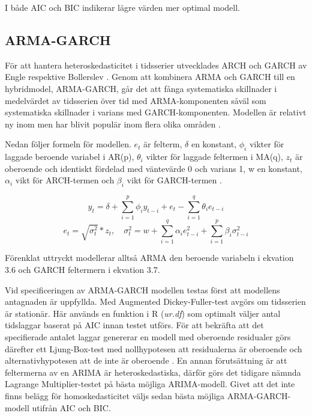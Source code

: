 \documentclass[11pt]{article}
\numberwithin{equation}{section}
\numberwithin{table}{section}
\numberwithin{figure}{section}
\begin{document}
I både AIC och BIC indikerar lägre värden mer optimal modell. 

\subsection{ARMA-GARCH}
För att hantera heteroskedasticitet i tidsserier utvecklades ARCH och GARCH av Engle \parencite*{engle1982autoregressive} respektive Bollerslev \parencite*{bollerslev1986generalized}. Genom att kombinera ARMA och GARCH till en hybridmodel, ARMA-GARCH, går det att fånga systematiska skillnader i medelvärdet av tidsserien över tid med ARMA-komponenten såväl som systematiska skillnader i varians med GARCH-komponenten. Modellen är relativt ny inom men har blivit populär inom flera olika områden \parencite{chen2011short}. 

Nedan följer formeln för modellen. \(e_t\) är felterm, \(\delta\) en konstant, \(\phi_i\) vikter för laggade beroende variabel i AR(p), \(\theta_i\) vikter för laggade feltermen i MA(q), \(z_t\) är oberoende och identiskt fördelad med väntevärde 0 och varians 1, w en konstant, \(\alpha_i\) vikt för ARCH-termen och \(\beta_i\) vikt för GARCH-termen \parencite[][,s.507 ff.]{bollerslev1986generalized, montgomery2015forecasting}.

\begin{equation}
    y_t = \delta + \sum_{i=1}^{p}\phi_iy_{t-i}  +e_t - \sum_{i=1}^{q}\theta_i e_{t-i} 
\end{equation}
\begin{equation}
    e_t=\sqrt{\sigma_t^2}*z_t,\quad \sigma^2_t=w + \sum_{i=1}^{q}\alpha_i e^2_{t-i} + \sum_{i=1}^{p}\beta_i \sigma^2_{t-i}
\end{equation}

Förenklat uttryckt modellerar alltså ARMA den beroende variabeln i ekvation 3.6 och GARCH feltermern i ekvation 3.7. 

Vid specificeringen av ARMA-GARCH modellen testas först att modellens antagnaden är uppfyllda. Med Augmented Dickey-Fuller-test avgörs om tidsserien är stationär. Här används en funktion  i R (\textit{ur.df}) som optimalt väljer antal tidslaggar baserat på AIC innan testet utförs.  För att bekräfta att det specifierade antalet laggar genererar en modell med oberoende residualer görs därefter ett Ljung-Box-test med nollhypotesen att residualerna är oberoende och alternativhypotesen att de inte är oberoende \parencite{box1970distribution}. En annan förutsättning är att feltermerna av en ARIMA är heteroskedastiska, därför görs det tidigare nämnda Lagrange Multiplier-testet på bästa möjliga ARIMA-modell. Givet att det inte finns belägg för homoskedasticitet väljs sedan bästa möjliga ARMA-GARCH-modell utifrån AIC och BIC. 
\end{document}
